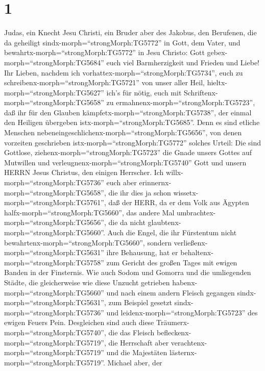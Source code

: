 \hypertarget{section}{%
\section{1}\label{section}}

 Judas, ein Knecht Jesu Christi, ein Bruder aber des
Jakobus, den Berufenen, die da geheiligt
sindx-morph=``strongMorph:TG5772'' in Gott, dem Vater, und
bewahrtx-morph=``strongMorph:TG5772'' in Jesu Christo:  Gott
gebex-morph=``strongMorph:TG5684'' euch viel Barmherzigkeit und Frieden
und Liebe!  Ihr Lieben, nachdem ich
vorhattex-morph=``strongMorph:TG5734'', euch zu
schreibenx-morph=``strongMorph:TG5721'' von unser aller Heil,
hieltx-morph=``strongMorph:TG5627'' ich's für nötig, euch mit
Schriftenx-morph=``strongMorph:TG5658'' zu
ermahnenx-morph=``strongMorph:TG5723'', daß ihr für den Glauben
kämpfetx-morph=``strongMorph:TG5738'', der einmal den Heiligen übergeben
istx-morph=``strongMorph:TG5685''.  Denn es sind etliche
Menschen nebeneingeschlichenx-morph=``strongMorph:TG5656'', von denen
vorzeiten geschrieben istx-morph=``strongMorph:TG5772'' solches Urteil:
Die sind Gottlose, ziehenx-morph=``strongMorph:TG5723'' die Gnade unsers
Gottes auf Mutwillen und verleugnenx-morph=``strongMorph:TG5740'' Gott
und unsern HERRN Jesus Christus, den einigen Herrscher.  Ich
willx-morph=``strongMorph:TG5736'' euch aber
erinnernx-morph=``strongMorph:TG5658'', die ihr dies ja schon
wissetx-morph=``strongMorph:TG5761'', daß der HERR, da er dem Volk aus
Ägypten halfx-morph=``strongMorph:TG5660'', das andere Mal
umbrachtex-morph=``strongMorph:TG5656'', die da nicht
glaubtenx-morph=``strongMorph:TG5660''.  Auch die Engel, die
ihr Fürstentum nicht bewahrtenx-morph=``strongMorph:TG5660'', sondern
verließenx-morph=``strongMorph:TG5631'' ihre Behausung, hat er
behaltenx-morph=``strongMorph:TG5758'' zum Gericht des großen Tages mit
ewigen Banden in der Finsternis.  Wie auch Sodom und Gomorra
und die umliegenden Städte, die gleicherweise wie diese Unzucht
getrieben habenx-morph=``strongMorph:TG5660'' und nach einem andern
Fleisch gegangen sindx-morph=``strongMorph:TG5631'', zum Beispiel
gesetzt sindx-morph=``strongMorph:TG5736'' und
leidenx-morph=``strongMorph:TG5723'' des ewigen Feuers Pein.
 Desgleichen sind auch diese
Träumerx-morph=``strongMorph:TG5740'', die das Fleisch
befleckenx-morph=``strongMorph:TG5719'', die Herrschaft aber
verachtenx-morph=``strongMorph:TG5719'' und die Majestäten
lästernx-morph=``strongMorph:TG5719''.  Michael aber, der
